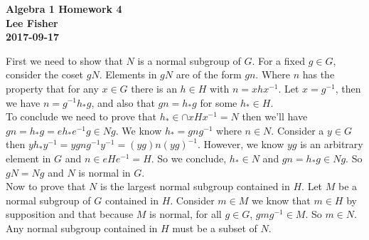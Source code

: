 \documentclass[12pt]{report}
\begin{document}
\textbf{Algebra 1 Homework 4}\\
\indent \textbf{Lee Fisher}\\
\indent \textbf{2017-09-17}

\vspace{0.3cm}


First we need to show that $N$ is a normal subgroup of $G$.
For a fixed $g \in G$, consider the coset $gN$. Elements in $gN$ are of the form
$gn$. Where $n$ has the property that for any $x \in G$ there is an $h \in H$
with $n = xhx^{-1}$. Let $x = g^{-1}$, then we have $n = g^{-1}h_*g$, and also
that $gn = h_*g$ for some $h_* \in H$.\\

To conclude we need to prove that $h_* \in \cap xHx^{-1} =N$ then we'll have $gn
= h_*g = eh_*e^{-1}g \in Ng$. We know $h_* = gng^{-1}$ where $n \in N$. Consider
a $y \in G$ then $yh_*y^{-1} = ygng^{-1}y^{-1} = (yg)n(yg)^{-1}$. However, we
know $yg$ is an arbitrary element in $G$ and $n \in eHe^{-1} = H$. So we
conclude, $h_* \in N$ and $gn = h_*g \in Ng$. So $gN = Ng$ and $N$ is normal in
$G$.\\

Now to prove that $N$ is the largest normal subgroup contained in $H$. Let $M$
be a normal subgroup of $G$ contained in $H$. Consider $m \in M$ we know that
$m \in H$ by supposition and that because $M$ is normal, for all $g \in G$,
$gmg^{-1} \in M$. So $m \in N$. Any normal subgroup contained in $H$ must be a
subset of $N$.\\


\end{document}

